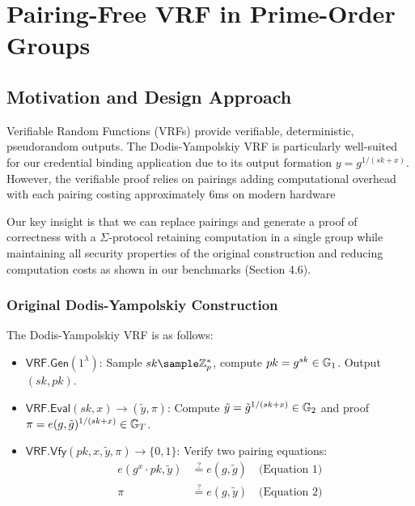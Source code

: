\section{Pairing-Free VRF in Prime-Order Groups}

\subsection{Motivation and Design Approach}
Verifiable Random Functions (VRFs) provide verifiable, deterministic, pseudorandom outputs. The Dodis-Yampolskiy VRF \cite{hutchison_verifiable_2005} is particularly well-suited for our credential binding application due to its output formation $y = g^{1/(sk+x)}$. However, the verifiable proof relies on pairings adding computational overhead with each pairing costing approximately 6ms on modern hardware \cite{polgar_anonymous_2025}

Our key insight is that we can replace pairings and generate a proof of correctness with a $\Sigma$-protocol retaining computation in a single group while maintaining all security properties of the original construction and reducing computation costs as shown in our benchmarks (Section 4.6).

\subsubsection{Original Dodis-Yampolskiy Construction}
The Dodis-Yampolskiy VRF is as follows:

\begin{itemize}
    \item $\mathsf{VRF.Gen}(1^\lambda)$: Sample $sk \sample \mathbb{Z}_p^*$, compute $pk = g^{sk} \in \mathbb{G}_1$. Output $(sk, pk)$.
    
    \item $\mathsf{VRF.Eval}(sk, x) \to (\tilde{y}, \pi)$: Compute $\tilde{y} = \tilde{g}^{1/(sk + x)} \in \mathbb{G}_2$ and proof $\pi = e(g, \tilde{g})^{1/(sk + x)} \in \mathbb{G}_T$.
    
    \item $\mathsf{VRF.Vfy}(pk, x, \tilde{y}, \pi) \to \{0, 1\}$: Verify two pairing equations:
    \begin{align}
        e(g^{x} \cdot pk, \tilde{y}) &\stackrel{?}{=} e(g, \tilde{g}) \quad \text{(Equation 1)}\\
        \pi &\stackrel{?}{=} e(g, \tilde{y}) \quad \text{(Equation 2)}
    \end{align}
\end{itemize}


